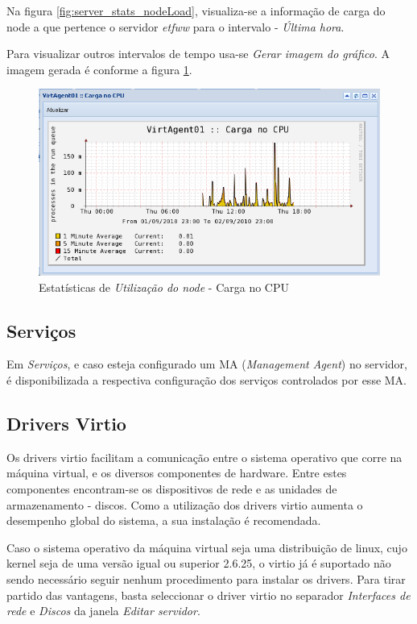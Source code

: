 Na figura \ref{fig:server_stats_nodeLoad}, visualiza-se a informação de carga do node a que pertence o servidor \emph{etfww} para o intervalo - \emph{Última hora}.

Para visualizar outros intervalos de tempo usa-se \emph{Gerar imagem do gráfico}. A imagem gerada é conforme a figura \ref{fig:server_stats_nodeLoadRange}.
\begin{figure}[H]
	\begin{center}
	\includegraphics[scale=0.5]{screenshots/server_stats_nodeLoadRange.png}
	\caption{Estatísticas de \emph{Utilização do node} - Carga no CPU}
	\label{fig:server_stats_nodeLoadRange}
	\end{center}
\end{figure}

\subsection{Serviços}
Em \emph{Serviços}, e caso esteja configurado um MA (\emph{Management Agent}) no servidor, é disponibilizada a respectiva configuração dos serviços controlados por esse MA.

\subsection{Drivers Virtio}
Os drivers virtio facilitam a comunicação entre o sistema operativo que corre na máquina virtual, e os diversos componentes de hardware. Entre estes componentes encontram-se os dispositivos de rede e as unidades de armazenamento - discos. Como a utilização dos drivers virtio aumenta o desempenho global do sistema, a sua instalação é recomendada.

Caso o sistema operativo da máquina virtual seja uma distribuição de linux, cujo kernel seja de uma versão igual ou superior 2.6.25, o virtio já é suportado não sendo necessário seguir nenhum procedimento para instalar os drivers. Para tirar partido das vantagens, basta seleccionar o driver virtio no separador \textit{Interfaces de rede} e \textit{Discos} da janela \textit{Editar servidor}.

